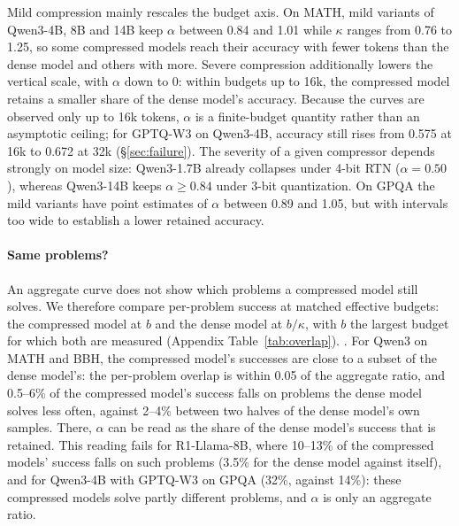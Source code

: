 \documentclass[10pt]{article}
\begin{document}
\begin{table}[t]
  \centering\small\setlength{\tabcolsep}{3pt}
  \caption{Ranges of $\alpha$ and $\kappa$ by regime and maximum fit error per model and task. Per-variant values with bootstrap intervals are in Appendix~\ref{app:tables}.}
  \label{tab:alpha}
\end{table}

Mild compression mainly rescales the budget axis. On MATH, mild variants of Qwen3-4B, 8B and 14B keep $\alpha$ between 0.84 and 1.01 while $\kappa$ ranges from 0.76 to 1.25, so some compressed models reach their accuracy with fewer tokens than the dense model and others with more. Severe compression additionally lowers the vertical scale, with $\alpha$ down to 0: within budgets up to 16k, the compressed model retains a smaller share of the dense model's accuracy. Because the curves are observed only up to 16k tokens, $\alpha$ is a finite-budget quantity rather than an asymptotic ceiling; for GPTQ-W3 on Qwen3-4B, accuracy still rises from 0.575 at 16k to 0.672 at 32k (\S\ref{sec:failure}). The severity of a given compressor depends strongly on model size: Qwen3-1.7B already collapses under 4-bit RTN ($\alpha=0.50$), whereas Qwen3-14B keeps $\alpha\ge0.84$ under 3-bit quantization. On GPQA the mild variants have point estimates of $\alpha$ between 0.89 and 1.05, but with intervals too wide to establish a lower retained accuracy.

\paragraph{Same problems?}
An aggregate curve does not show which problems a compressed model still solves. We therefore compare per-problem success at matched effective budgets: the compressed model at $b$ and the dense model at $b/\kappa$, with $b$ the largest budget for which both are measured (Appendix Table~\ref{tab:overlap}). . For Qwen3 on MATH and BBH, the compressed model's successes are close to a subset of the dense model's: the per-problem overlap is within 0.05 of the aggregate ratio, and 0.5--6\% of the compressed model's success falls on problems the dense model solves less often, against 2--4\% between two halves of the dense model's own samples. There, $\alpha$ can be read as the share of the dense model's success that is retained. This reading fails for R1-Llama-8B, where 10--13\% of the compressed models' success falls on such problems (3.5\% for the dense model against itself), and for Qwen3-4B with GPTQ-W3 on GPQA (32\%, against 14\%): these compressed models solve partly different problems, and $\alpha$ is only an aggregate ratio.
\end{document}
